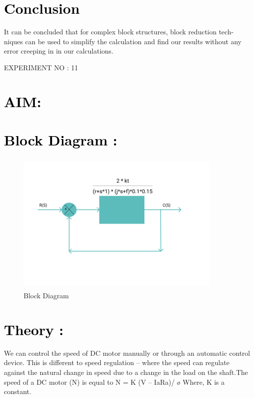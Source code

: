 \documentclass[12pt]{article}
\begin{document}
\section*{\textcolor{black}{Conclusion}}
It can be concluded that for complex block structures, block reduction tech- niques can be used to simplify the calculation and find our results without any error creeping in in our calculations.
 \pagebreak

 \begin{center}
    \LARGE {EXPERIMENT NO : 11}
             
\end{center}

\section*{\textcolor{black}{AIM: }}


\section*{\textcolor{black}{Block Diagram :}}

\begin{figure}[!hth]
        \centering
        \includegraphics[width =10cm, height = 7cm]{images/speed control.png}
        \caption{Block Diagram}
        \label{Graph}
\end{figure}

\section*{\textcolor{black}{Theory :}}
We can control the speed of DC motor manually or through an automatic control device. This is different to speed regulation – where the speed can regulate against the natural change in speed due to a change in the load on the shaft.The speed of a DC motor (N) is equal to
N = K (V – IaRa)/ ø Where, K is a constant.
\end{document}
